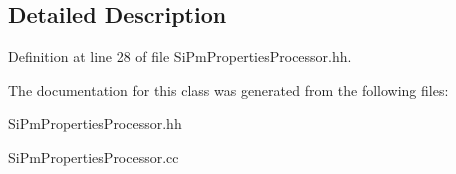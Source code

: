 \subsection{Detailed Description}


Definition at line 28 of file SiPmPropertiesProcessor.hh.

The documentation for this class was generated from the following files:\begin{DoxyCompactItemize}
\item 
SiPmPropertiesProcessor.hh\item 
SiPmPropertiesProcessor.cc\end{DoxyCompactItemize}
